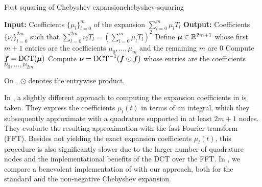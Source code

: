 \begin{algo}{Fast squaring of Chebyshev expansion}{chebyshev-squaring}
    \begin{algorithmic}[1]
        \Statex \textbf{Input:} Coefficients $\{ \mu_l \}_{l=0}^{m}$ of the expansion $\sum_{l=0}^{m} \mu_l T_l$
        \Statex \textbf{Output:} Coefficients $\{ \nu_l \}_{l=0}^{2m}$ such that $\sum_{l=0}^{2m} \nu_l T_l = (\sum_{l=0}^{m} \mu_l T_l)^2$
        \State Define $\boldsymbol{\mu} \in \mathbb{R}^{2m + 1}$ whose first $m + 1$ entries are the coefficients $\mu_0, \dots, \mu_m$ and the remaining $m$ are $0$
    \State Compute $\boldsymbol{f} = \operatorname{DCT}(\boldsymbol{\mu})$
    \State Compute $\boldsymbol{\nu} = \operatorname{DCT}^{-1}(\boldsymbol{f} \odot \boldsymbol{f})$ whose entries are the coefficients $\nu_0, \dots, \nu_{2m}$
    \label{lin:inverse-DCT}
    \end{algorithmic}
\end{algo}
On , $\odot$ denotes the entrywise product. 

In \cite{lin-2017-randomized-estimation}, a slightly different approach to computing the expansion coefficients in  is taken. They express the coefficients $\mu_l(t)$ in terms of an integral, which they subsequently approximate with a quadrature supported in at least $2m + 1$ nodes. They evaluate the resulting approximation with the fast Fourier transform (FFT). Besides not yielding the exact expansion coefficients $\mu_l(t)$, this procedure is also significantly slower due to the larger number of quadrature nodes and the implementational benefits of the DCT over the FFT. In , we compare a benevolent implementation of \cite[Algorithm 1]{lin-2017-randomized-estimation} with our approach, both for the standard and the non-negative Chebyshev expansion.

\begin{table}[ht]
    \caption{We compare the runtime in milliseconds for computing the coefficients of the Chebyshev expansion of the smoothing kernel $g_{\sigma}$  in three different ways: as proposed in \cite[Algorithm 1]{lin-2017-randomized-estimation} (\emph{FFT}), using the discrete cosine transform (\emph{DCT}) , and using the discrete cosine transform to compute a non-negative Chebyshev expansion with  (\emph{non-negative DCT}). We use $\sigma=0.005$, $n_t=1000$ parameter values, and various degrees $m$. For stability, we average over 7 runs of the algorithms and repeat these runs 1000 times to form the mean and standard deviation which are given in the below table.}
    \label{tab:chebyshev-timing-interpolation}
   
\end{table}

